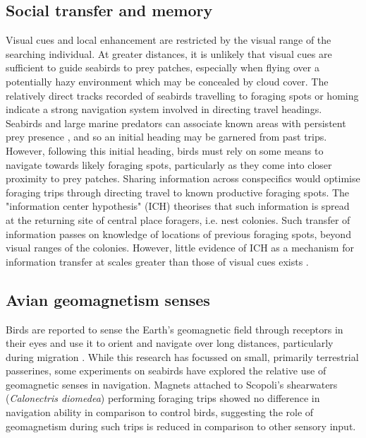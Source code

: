 \documentclass[9pt,twocolumn,twoside,lineno]{pnas-new}
\begin{document}
\subsection{Social transfer and memory}
Visual cues and local enhancement are restricted by the visual range of the searching individual. At greater distances, it is unlikely that visual cues are sufficient to guide seabirds to prey patches, especially when flying over a potentially hazy environment which may be concealed by cloud cover. The relatively direct tracks recorded of seabirds travelling to foraging spots or homing \citep{Weimerskirch_2007b,Pollonara_2015} indicate a strong navigation system involved in directing travel headings. Seabirds and large marine predators can associate known areas with persistent prey presence \citep{Davoren_2013}, and so an initial heading may be garnered from past trips. However, following this initial heading, birds must rely on some means to navigate towards likely foraging spots, particularly as they come into closer proximity to prey patches. Sharing information across conspecifics would optimise foraging trips through directing travel to known productive foraging spots. The "information center hypothesis" (ICH) theorises that such information is spread at the returning site of central place foragers, i.e. nest colonies. Such transfer of information passes on knowledge of locations of previous foraging spots, beyond visual ranges of the colonies. However, little evidence of ICH as a mechanism for information transfer at scales greater than those of visual cues exists \citep{Davoren_2003}.

\subsection{Avian geomagnetism senses}
Birds are reported to sense the Earth's geomagnetic field through receptors in their eyes and use it to orient and navigate over long distances, particularly during migration \citep{Wiltschko_2011,Hiscock_2016}. While this research has focussed on small, primarily terrestrial passerines, some experiments on seabirds have explored the relative use of geomagnetic senses in navigation. Magnets attached to Scopoli's shearwaters (\textit{Calonectris diomedea}) performing foraging trips showed no difference in navigation ability in comparison to control birds, suggesting the role of geomagnetism during such trips is reduced in comparison to other sensory input.

\end{document}
